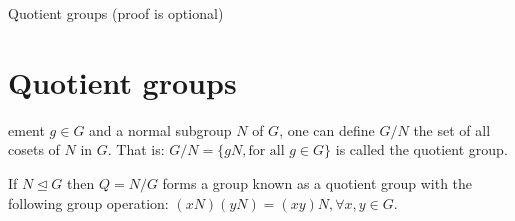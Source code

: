 \documentclass{beamer}
\begin{document}
\begin{frame}{Quotient groups (proof is optional)}
	\section{Quotient groups}
	\begin{definition}ement $g \in G$ and a normal subgroup $N$ of $G$, one can define $G / N$ the set of 
		all cosets of $N$ in $G$. That is: $G / N = \{ gN, \text{for all } g \in G\}$ is called the quotient group.
	\end{definition}

	\begin{theorem}
		If $N \unlhd G$ then $Q = N/G$ forms a group known as a quotient group with the following group operation: 
		\newline
		$(xN)(yN) = (xy)N, \forall x, y \in G$.
	\end{theorem}
\end{frame}
\end{document}
